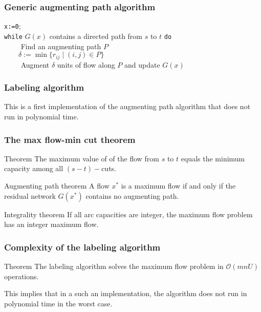 \documentclass[9pt,handout]{beamer}
\begin{document}
\begin{frame}
\frametitle{Generic augmenting path algorithm}
\texttt{x:=0};\\
\texttt{while} $G(x)$ contains a directed path from $s$ to $t$ \texttt{do}\\
	$\qquad$ Find an augmenting path $P$\\
	$\qquad \delta:= \min\{r_{ij} \mid (i,j)\in P\}$\\
	$\qquad$ Augment $\delta$ units of flow along $P$ and update $G(x)$
\bigskip

\end{frame}
\begin{frame}
\frametitle{Labeling algorithm}
This is a first implementation of the augmenting path algorithm
that \alert{does not run in polynomial time}.\bigskip


\end{frame}
\begin{frame}
\frametitle{The max flow-min cut theorem}
\begin{block}{Theorem}
The maximum value of of the flow from $s$ to $t$ equals the minimum
capacity among all $(s-t)-$cuts.
\end{block}
\begin{block}{Augmenting path theorem}
A flow $x^*$ is a \alert{maximum flow}
if and only if the residual network $G(x^*)$
\alert{contains no augmenting path}.
\end{block}
\begin{block}{Integrality theorem}
If all arc capacities are \alert{integer}, the maximum flow problem
has an \alert{integer} maximum flow.
\end{block}
\end{frame}
\begin{frame}
\frametitle{Complexity of the labeling algorithm}
\begin{block}{Theorem}
The labeling algorithm solves the maximum flow problem
in $\mathcal O(mnU)$ operations.
\end{block}
This implies that in a such an implementation, the algorithm
\alert{does not run } in polynomial time in the \alert{worst case}.
\end{frame}
\end{document}
